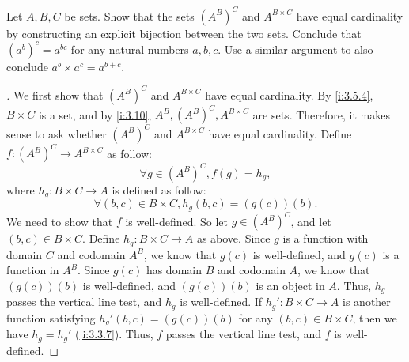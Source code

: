 \begin{ex}\label{i:ex:3.6.6}
  Let \(A, B, C\) be sets.
  Show that the sets \((A^B)^C\) and \(A^{B \times C}\) have equal cardinality by constructing an explicit bijection between the two sets.
  Conclude that \((a^b)^c = a^{bc}\) for any natural numbers \(a, b, c\).
  Use a similar argument to also conclude \(a^b \times a^c = a^{b+c}\).
\end{ex}

\begin{proof}[]
  We first show that \((A^B)^C\) and \(A^{B \times C}\) have equal cardinality.
  By \cref{i:3.5.4}, \(B \times C\) is a set, and by \cref{i:3.10}, \(A^B, (A^B)^C, A^{B \times C}\) are sets.
  Therefore, it makes sense to ask whether \((A^B)^C\) and \(A^{B \times C}\) have equal cardinality.
  Define \(f : (A^B)^C \to A^{B \times C}\) as follow:
  \[
    \forall g \in (A^B)^C, f(g) = h_g,
  \]
  where \(h_g : B \times C \to A\) is defined as follow:
  \[
    \forall (b, c) \in B \times C, h_g(b, c) = (g(c))(b).
  \]
  We need to show that \(f\) is well-defined.
  So let \(g \in (A^B)^C\), and let \((b, c) \in B \times C\).
  Define \(h_g : B \times C \to A\) as above.
  Since \(g\) is a function with domain \(C\) and codomain \(A^B\), we know that \(g(c)\) is well-defined, and \(g(c)\) is a function in \(A^B\).
  Since \(g(c)\) has domain \(B\) and codomain \(A\), we know that \((g(c))(b)\) is well-defined, and \((g(c))(b)\) is an object in \(A\).
  Thus, \(h_g\) passes the vertical line test, and \(h_g\) is well-defined.
  If \(h_g' : B \times C \to A\) is another function satisfying \(h_g'(b, c) = (g(c))(b)\) for any \((b, c) \in B \times C\), then we have \(h_g = h_g'\) (\cref{i:3.3.7}).
  Thus, \(f\) passes the vertical line test, and \(f\) is well-defined.


\end{proof}
